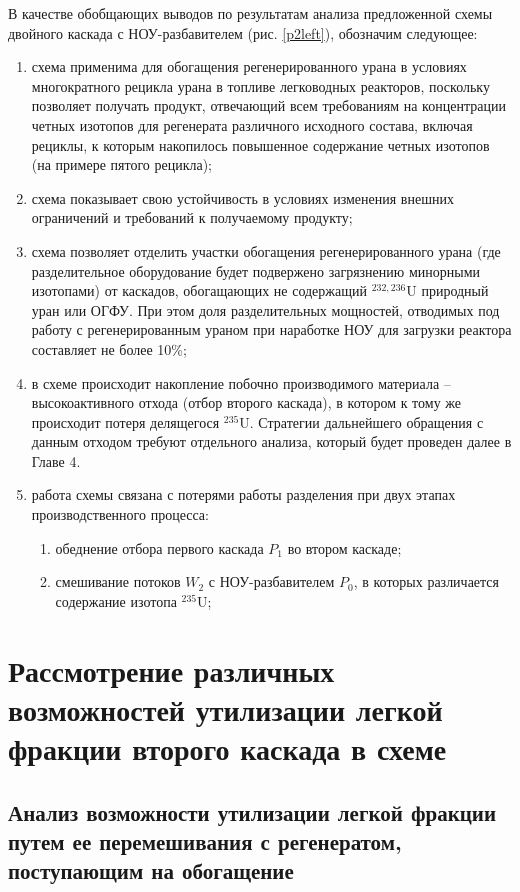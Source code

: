 В качестве обобщающих выводов по результатам анализа предложенной схемы двойного каскада с НОУ-разбавителем (рис. \ref{p2left}), обозначим следующее:
\begin{enumerate}
    \item схема применима для обогащения регенерированного урана в условиях многократного рецикла урана в топливе легководных реакторов, поскольку позволяет получать продукт, отвечающий всем требованиям на концентрации четных изотопов для регенерата различного исходного состава, включая рециклы, к которым накопилось повышенное содержание четных изотопов (на примере пятого рецикла);
    \item схема показывает свою устойчивость в условиях изменения внешних ограничений и требований к получаемому продукту;
    \item схема позволяет отделить участки обогащения регенерированного урана (где разделительное оборудование будет подвержено загрязнению минорными изотопами) от каскадов, обогащающих не содержащий $^{232,236}$U природный уран или ОГФУ. При этом доля разделительных мощностей, отводимых под работу с регенерированным ураном при наработке НОУ для загрузки реактора составляет не более 10\%;
     \item в схеме происходит накопление побочно производимого материала -- высокоактивного отхода (отбор второго каскада), в котором к тому же происходит потеря делящегося $^{235}$U. Стратегии дальнейшего обращения с данным отходом требуют отдельного анализа, который будет проведен далее в Главе 4.
    \item работа схемы связана с потерями работы разделения при двух этапах производственного процесса:
    \begin{enumerate}
        \item обеднение отбора первого каскада $P_1$ во втором каскаде;
        \item смешивание потоков $W_2$ с НОУ-разбавителем $P_0$, в которых различается содержание изотопа $^{235}$U;
    \end{enumerate}
\end{enumerate}






\section{Рассмотрение различных возможностей утилизации легкой фракции второго каскада в схеме}

\subsection{Анализ возможности утилизации легкой фракции путем ее перемешивания с регенератом, поступающим на обогащение}

